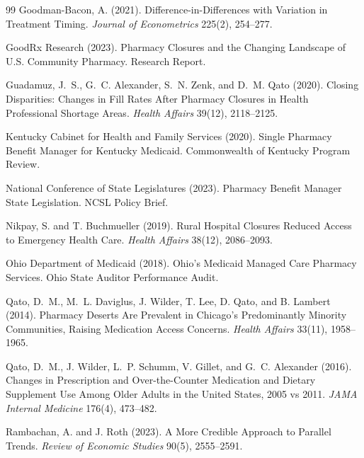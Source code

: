 \documentclass[12pt]{article}
\begin{document}
\begin{thebibliography}{99}
Goodman-Bacon, A. (2021).
\newblock Difference-in-Differences with Variation in Treatment Timing.
\newblock \emph{Journal of Econometrics} 225(2), 254--277.

{GoodRx Research} (2023).
\newblock Pharmacy Closures and the Changing Landscape of {U.S.} Community Pharmacy.
\newblock Research Report.

Guadamuz, J.~S., G.~C. Alexander, S.~N. Zenk, and D.~M. Qato (2020).
\newblock Closing Disparities: Changes in Fill Rates After Pharmacy Closures in Health Professional Shortage Areas.
\newblock \emph{Health Affairs} 39(12), 2118--2125.

{Kentucky Cabinet for Health and Family Services} (2020).
\newblock Single Pharmacy Benefit Manager for Kentucky Medicaid.
\newblock Commonwealth of Kentucky Program Review.

{National Conference of State Legislatures} (2023).
\newblock Pharmacy Benefit Manager State Legislation.
\newblock NCSL Policy Brief.

Nikpay, S. and T. Buchmueller (2019).
\newblock Rural Hospital Closures Reduced Access to Emergency Health Care.
\newblock \emph{Health Affairs} 38(12), 2086--2093.

{Ohio Department of Medicaid} (2018).
\newblock Ohio's Medicaid Managed Care Pharmacy Services.
\newblock Ohio State Auditor Performance Audit.

Qato, D.~M., M.~L. Daviglus, J. Wilder, T. Lee, D. Qato, and B. Lambert (2014).
\newblock Pharmacy Deserts Are Prevalent in {Chicago}'s Predominantly Minority Communities, Raising Medication Access Concerns.
\newblock \emph{Health Affairs} 33(11), 1958--1965.

Qato, D.~M., J. Wilder, L.~P. Schumm, V. Gillet, and G.~C. Alexander (2016).
\newblock Changes in Prescription and Over-the-Counter Medication and Dietary Supplement Use Among Older Adults in the {United States}, 2005 vs 2011.
\newblock \emph{JAMA Internal Medicine} 176(4), 473--482.

Rambachan, A. and J. Roth (2023).
\newblock A More Credible Approach to Parallel Trends.
\newblock \emph{Review of Economic Studies} 90(5), 2555--2591.


\end{thebibliography}
\end{document}
